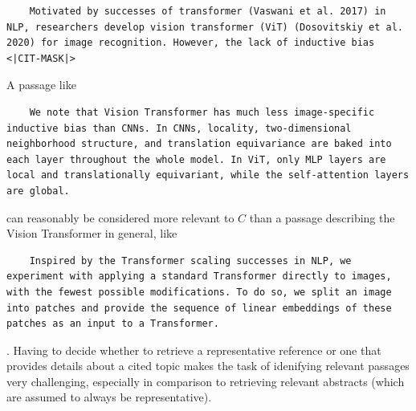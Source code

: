 \begin{lstlisting}
    Motivated by successes of transformer (Vaswani et al. 2017) in NLP, researchers develop vision transformer (ViT) (Dosovitskiy et al. 2020) for image recognition. However, the lack of inductive bias <|CIT-MASK|>
\end{lstlisting}
A passage like
\begin{lstlisting}
    We note that Vision Transformer has much less image-specific inductive bias than CNNs. In CNNs, locality, two-dimensional neighborhood structure, and translation equivariance are baked into each layer throughout the whole model. In ViT, only MLP layers are local and translationally equivariant, while the self-attention layers are global.
\end{lstlisting}
\cite[3.1]{dosovitskiy2020image} can reasonably be considered more relevant to $C$ than a passage describing the Vision Transformer \cite{dosovitskiy2020image} in general, like
\begin{lstlisting}
    Inspired by the Transformer scaling successes in NLP, we experiment with applying a standard Transformer directly to images, with the fewest possible modifications. To do so, we split an image into patches and provide the sequence of linear embeddings of these patches as an input to a Transformer.
\end{lstlisting}
\cite[1]{dosovitskiy2020image}. Having to decide whether to retrieve a representative reference or one that provides details about a cited topic makes the task of idenifying relevant passages very challenging, especially in comparison to retrieving relevant abstracts (which are assumed to always be representative).

